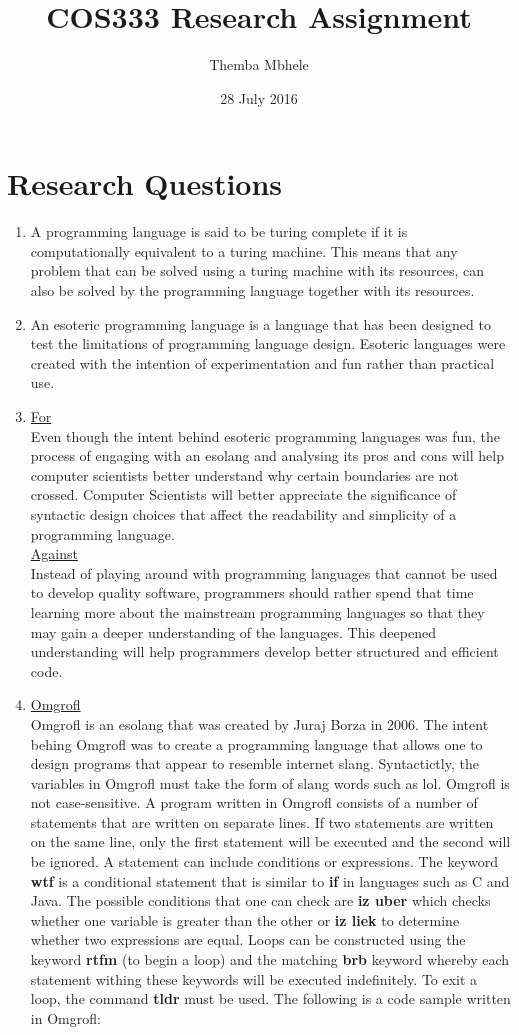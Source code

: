 \documentclass{article}
\title{COS333 Research Assignment}
\author{Themba Mbhele}
\date{28 July 2016}
\begin{document}
\maketitle

\section{Research Questions}
\begin{enumerate}
    \item A programming language is said to be turing complete if it is computationally equivalent to a turing machine. This means that any problem that can be solved using a turing machine with its resources, can also be solved by the programming language together with its resources.
    \item An esoteric programming language is a language that has been designed to test the limitations of programming language design. Esoteric languages were created with the intention of experimentation and fun rather than practical use.
    \item \underline{For} \\ Even though the intent behind esoteric programming languages was fun, the process of engaging with an esolang and analysing its pros and cons will help computer scientists better understand why certain boundaries are not crossed. Computer Scientists will better appreciate the significance of syntactic design choices that affect the readability and simplicity of a programming language.\\ \underline{Against}\\ Instead of playing around with programming languages that cannot be used to develop quality software, programmers should rather spend that time learning more about the mainstream programming languages so that they may gain a deeper understanding of the languages. This deepened understanding will help programmers develop better structured and efficient code. 
    \item \underline{Omgrofl} \\ Omgrofl is an esolang that was created by Juraj Borza in 2006. The intent behing Omgrofl was to create a programming language that allows one to design programs that appear to  resemble internet slang. Syntactictly, the variables in Omgrofl must take the form of slang words such as lol. Omgrofl is not case-sensitive. A program written in Omgrofl consists of a number of statements that are written on separate lines. If two statements are written on the same line, only the first statement will be executed and the second will be ignored. A statement can include conditions or expressions. The keyword \textbf{wtf} is a conditional statement that is similar to \textbf{if} in languages such as C and Java. The possible conditions that one can check are \textbf{iz uber} which checks whether one variable is greater than the other or \textbf{iz liek} to determine whether two expressions are equal. Loops can be constructed using the keyword \textbf{rtfm} (to begin a loop) and the matching \textbf{brb} keyword whereby each statement withing these keywords will be executed indefinitely. To exit a loop, the command \textbf{tldr} must be used. The following is a code sample written in Omgrofl:\\

\end{enumerate}
\end{document}
